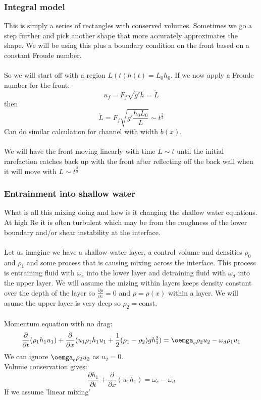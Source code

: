 \documentclass{article}
\begin{document}
         \subsubsection{Integral model}
         This is simply a series of rectangles with conserved volumes. Sometimes we go a step further and pick another shape that more accurately approximates the shape. We will be using this plus a boundary condition on the front based on a constant Froude number.\\\\
         So we will start off with a region $L(t)h(t) = L_0  h_0$. If we now apply a Froude number for the front:
         $$
          u_f = F_f \sqrt{g' h} = \dot L
         $$
         then 
         $$
          \dot L = F_f \sqrt{ g' \frac{h_0 L_0}{L}} \sim t^{\frac{2}{3}}
         $$
         Can do similar calculation for channel with width $b(x)$.\\\\
         We will have the front moving linearly with time $L \sim t$ until the initial rarefaction catches back up with the front after reflecting off the back wall when it will move with $L \sim t^{\frac{2}{3}}$
         \subsubsection{Entrainment into shallow water}
         What is all this mixing doing and how is it changing the shallow water equations. At high Re it is often turbulent which may be from the roughness of the lower boundary and/or shear instability at the interface. \\\\
         Let us imagine we have a shallow water layer, a control volume and densities $\rho_0$ and $\rho_1$ and some process that is causing mixing across the interface. This process is entraining fluid with $\omega_e$ into the lower layer and detraining fluid with $\omega_d$ into the upper layer. We will assume the mizing within layers keeps density constant over the depth of the layer so $\frac{\partial \rho}{\partial z} = 0$ and $\rho = \rho(x)$ within a layer. We will asume the upper layer is very deep so $\rho_2 = $const.\\\\
         Momentum equation with no drag:
         $$
          \frac{\partial}{\partial t} ( \rho_1 h_1 u_1) + \frac{\partial }{\partial x} ( u_1 \rho_1 h_1 u_1 + \frac{1}{2} (\rho_1 - \rho_2) g h_1^2) = \oemga_e \rho_2 u_2 - \omega_d \rho_1 u_1
         $$
         We can ignore $\oemga_e \rho_2 u_2$ as $u_2 = 0$.\\
         Volume conservation gives:
         $$
          \frac{\partial h_1}{\partial t} + \frac{\partial}{\partial x} (u_1 h_1) = \omega_e - \omega_d
         $$
         If we assume 'linear mixing'
\end{document}
